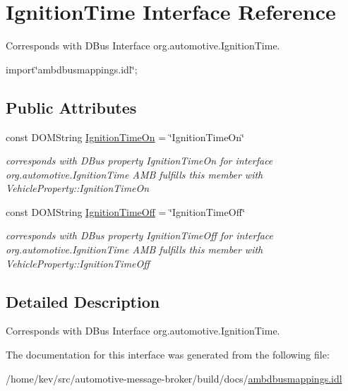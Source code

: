 \hypertarget{interfaceIgnitionTime}{\section{Ignition\+Time Interface Reference}
\label{interfaceIgnitionTime}
}


Corresponds with D\+Bus Interface org.\+automotive.\+Ignition\+Time.  




{\ttfamily import\char`\"{}ambdbusmappings.\+idl\char`\"{};}

\subsection*{Public Attributes}
\begin{DoxyCompactItemize}
\item 
\hypertarget{interfaceIgnitionTime_a8b060c116de69b2b2faa7bc804de20ea}{const D\+O\+M\+String \hyperlink{interfaceIgnitionTime_a8b060c116de69b2b2faa7bc804de20ea}{Ignition\+Time\+On} = \char`\"{}Ignition\+Time\+On\char`\"{}}\label{interfaceIgnitionTime_a8b060c116de69b2b2faa7bc804de20ea}

\begin{DoxyCompactList}\small\item\em corresponds with D\+Bus property Ignition\+Time\+On for interface org.\+automotive.\+Ignition\+Time A\+M\+B fulfills this member with Vehicle\+Property\+::\+Ignition\+Time\+On \end{DoxyCompactList}\item 
\hypertarget{interfaceIgnitionTime_a41d63201cf659eb7c74fd1df0660950f}{const D\+O\+M\+String \hyperlink{interfaceIgnitionTime_a41d63201cf659eb7c74fd1df0660950f}{Ignition\+Time\+Off} = \char`\"{}Ignition\+Time\+Off\char`\"{}}\label{interfaceIgnitionTime_a41d63201cf659eb7c74fd1df0660950f}

\begin{DoxyCompactList}\small\item\em corresponds with D\+Bus property Ignition\+Time\+Off for interface org.\+automotive.\+Ignition\+Time A\+M\+B fulfills this member with Vehicle\+Property\+::\+Ignition\+Time\+Off \end{DoxyCompactList}\end{DoxyCompactItemize}


\subsection{Detailed Description}
Corresponds with D\+Bus Interface org.\+automotive.\+Ignition\+Time. 

The documentation for this interface was generated from the following file\+:\begin{DoxyCompactItemize}
\item 
/home/kev/src/automotive-\/message-\/broker/build/docs/\hyperlink{ambdbusmappings_8idl}{ambdbusmappings.\+idl}\end{DoxyCompactItemize}
